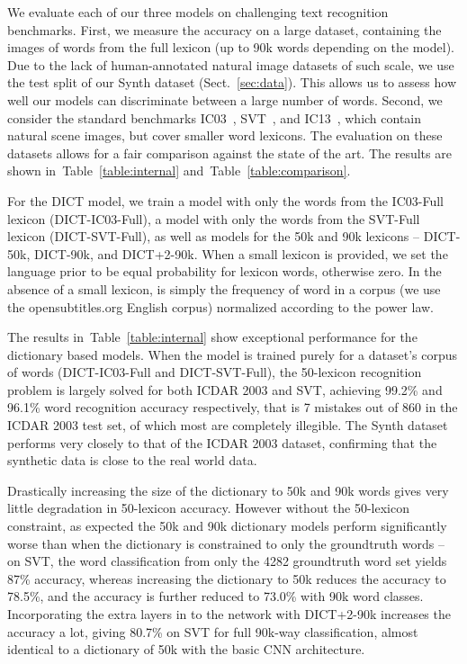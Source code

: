\documentclass{article} \usepackage{nips14submit_e,times}
\newcommand{\tblref}[1]{Table~\ref{#1}}
\renewcommand{\paragraph}[1]{\par\noindent{\bf #1}}
\begin{document}
We evaluate each of our three models on challenging text recognition benchmarks. First, we measure the accuracy on a large dataset, containing the images of words from the full lexicon (up to 90k words depending on the model). Due to the lack of human-annotated natural image datasets of such scale, we use the test split of our Synth dataset (Sect.~\ref{sec:data}). This allows us to assess how well our models can discriminate between a large number of words. Second, we consider the standard benchmarks IC03~\cite{ICDAR03}, SVT~\cite{Wang11}, and IC13~\cite{ICDAR2013}, which contain natural scene images, but cover smaller word lexicons. The evaluation on these datasets allows for a fair comparison against the state of the art. The results are shown in~\tblref{table:internal} and~\tblref{table:comparison}. 

\paragraph{Dictionary Encoding.}
For the DICT model, we train a model with only the words from the IC03-Full lexicon (DICT-IC03-Full), a model with only the words from the SVT-Full lexicon (DICT-SVT-Full), as well as models for the 50k and 90k lexicons -- DICT-50k, DICT-90k, and DICT+2-90k. When a small lexicon is provided, we set the language prior  to be equal probability for lexicon words, otherwise zero. In the absence of a small lexicon,  is simply the frequency of word  in a corpus (we use the opensubtitles.org English corpus) normalized according to the power law.

The results in~\tblref{table:internal} show exceptional performance for the dictionary based models. When the model is trained purely for a dataset's corpus of words (DICT-IC03-Full and DICT-SVT-Full), the 50-lexicon recognition problem is largely solved for both ICDAR 2003 and SVT, achieving 99.2\% and 96.1\% word recognition accuracy respectively, that is 7 mistakes out of 860 in the ICDAR 2003 test set, of which most are completely illegible. 
The Synth dataset performs very closely to that of the ICDAR 2003 dataset, confirming that the synthetic data is close to the real world data.

Drastically increasing the size of the dictionary to 50k and 90k words gives very little degradation in 50-lexicon accuracy. However without the 50-lexicon constraint, as expected the 50k and 90k dictionary models perform significantly worse than when the dictionary is constrained to only the groundtruth words -- on SVT, the word classification from only the 4282 groundtruth word set yields 87\% accuracy, whereas increasing the dictionary to 50k reduces the accuracy to 78.5\%, and the accuracy is further reduced to 73.0\% with 90k word classes. Incorporating the extra layers in to the network with DICT+2-90k increases the accuracy a lot, giving 80.7\% on SVT for full 90k-way classification, almost identical to a dictionary of 50k with the basic CNN architecture.
\end{document}
